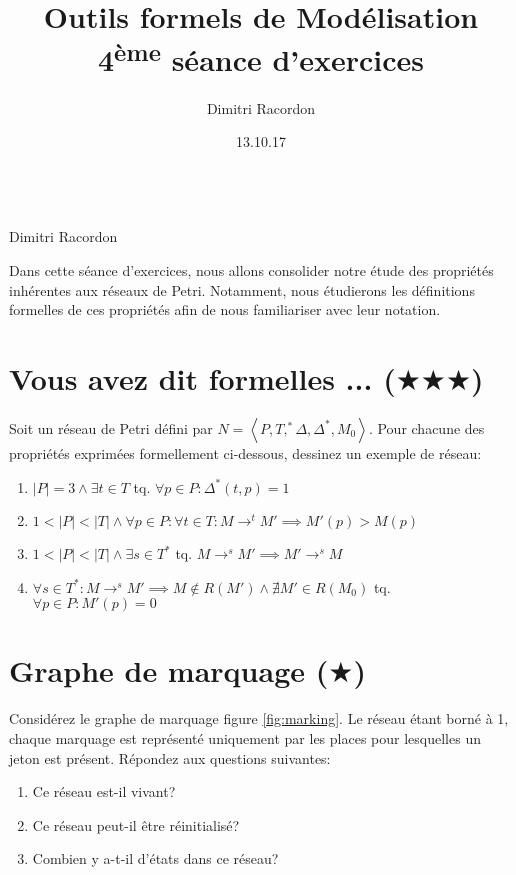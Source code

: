 \documentclass[a4paper, titlepage]{article}
\makeatletter
\numberwithin{figure}{section}
\numberwithin{table}{section}
\newcommand{\tuple}[1]{\ensuremath{\left \langle #1 \right \rangle }}
\newcommand{\card}[1]{\ensuremath{\left \vert #1 \right \vert }}
\newcommand\objective[1]{\def\@objective{#1}}
\newcommand{\makecustomtitle}{%
	\begin{center}
		\huge\@title \\
		[1ex]\small Dimitri Racordon \\ \@date
	\end{center}
	\@objective
}
\makeatother
\begin{document}
  \title{Outils formels de Modélisation \\ 4\textsuperscript{ème} séance d'exercices}
  \author{Dimitri Racordon}
  \date{13.10.17}
	\objective{Dans cette séance d'exercices, nous allons consolider notre étude des propriétés inhérentes aux réseaux de Petri. Notamment, nous étudierons les définitions formelles de ces propriétés afin de nous familiariser avec leur notation.}

	\makecustomtitle

\section{Vous avez dit formelles ... ($\bigstar\bigstar\bigstar$)}

Soit un réseau de Petri défini par $N=\tuple{P,T,^*\Delta,\Delta^*,M_0}$.
Pour chacune des propriétés exprimées formellement ci-dessous, dessinez un exemple de réseau:
\begin{enumerate}
	\item $|P|=3 \wedge \exists t \in T$ tq. $\forall p \in P: \Delta^*(t,p) = 1$
	\item $1 < \card{P} < \card{T} \wedge \forall p \in P: \forall t \in T: M \rightarrow^t M' \implies M'(p) > M(p)$
  \item $1 < \card{P} < \card{T} \wedge \exists s \in T^*$ tq. $M \rightarrow^s M' \implies M' \rightarrow^s M$
  \item $\forall s \in T^*: M \rightarrow^s M' \implies M \notin R(M') \wedge \nexists M' \in R(M_0)$ tq. $\forall p \in P: M'(p) = 0$
\end{enumerate}

\section{Graphe de marquage ($\bigstar$)}

Considérez le graphe de marquage figure \ref{fig:marking}.
Le réseau étant borné à 1,
chaque marquage est représenté uniquement par les places pour lesquelles un jeton est présent.
Répondez aux questions suivantes:
\begin{enumerate}
	\item Ce réseau est-il vivant?
	\item Ce réseau peut-il être réinitialisé?
	\item Combien y a-t-il d'états dans ce réseau?
\end{enumerate}
\end{document}
